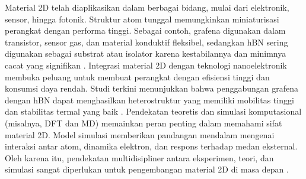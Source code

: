 Material 2D telah diaplikasikan dalam berbagai bidang, mulai dari elektronik, sensor, hingga fotonik. Struktur atom tunggal memungkinkan miniaturisasi perangkat dengan performa tinggi. Sebagai contoh, grafena digunakan dalam transistor, sensor gas, dan material konduktif fleksibel, sedangkan hBN sering digunakan sebagai substrat atau isolator karena kestabilannya dan minimnya cacat yang signifikan \citep{Geim2013}. Integrasi material 2D dengan teknologi nanoelektronik membuka peluang untuk membuat perangkat dengan efisiensi tinggi dan konsumsi daya rendah. Studi terkini menunjukkan bahwa penggabungan grafena dengan hBN dapat menghasilkan heterostruktur yang memiliki mobilitas tinggi dan stabilitas termal yang baik \citep{Wang2017}. Pendekatan teoretis dan simulasi komputasional (misalnya, DFT dan MD) memainkan peran penting dalam memahami sifat material 2D. Model simulasi memberikan pandangan mendalam mengenai interaksi antar atom, dinamika elektron, dan respons terhadap medan eksternal. Oleh karena itu, pendekatan multidisipliner antara eksperimen, teori, dan simulasi sangat diperlukan untuk pengembangan material 2D di masa depan \citep{Das2015}. %
